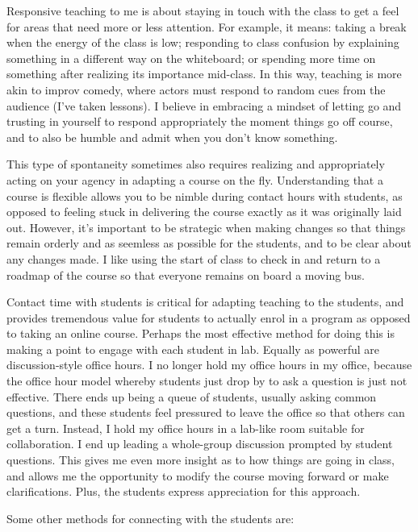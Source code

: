 \documentclass[]{article}
\begin{document}
Responsive teaching to me is about staying in touch with the class to get a feel for areas that need more or less attention. For example, it means: taking a break when the energy of the class is low; responding to class confusion by explaining something in a different way on the whiteboard; or spending more time on something after realizing its importance mid-class. In this way, teaching is more akin to improv comedy, where actors must respond to random cues from the audience (I've taken lessons). I believe in embracing a mindset of letting go and trusting in yourself to respond appropriately the moment things go off course, and to also be humble and admit when you don't know something.

This type of spontaneity sometimes also requires realizing and appropriately acting on your agency in adapting a course on the fly. Understanding that a course is flexible allows you to be nimble during contact hours with students, as opposed to feeling stuck in delivering the course exactly as it was originally laid out. However, it's important to be strategic when making changes so that things remain orderly and as seemless as possible for the students, and to be clear about any changes made. I like using the start of class to check in and return to a roadmap of the course so that everyone remains on board a moving bus.

Contact time with students is critical for adapting teaching to the students, and provides tremendous value for students to actually enrol in a program as opposed to taking an online course. Perhaps the most effective method for doing this is making a point to engage with each student in lab. Equally as powerful are discussion-style office hours. I no longer hold my office hours in my office, because the office hour model whereby students just drop by to ask a question is just not effective. There ends up being a queue of students, usually asking common questions, and these students feel pressured to leave the office so that others can get a turn. Instead, I hold my office hours in a lab-like room suitable for collaboration. I end up leading a whole-group discussion prompted by student questions. This gives me even more insight as to how things are going in class, and allows me the opportunity to modify the course moving forward or make clarifications. Plus, the students express appreciation for this approach.

Some other methods for connecting with the students are:
\end{document}
